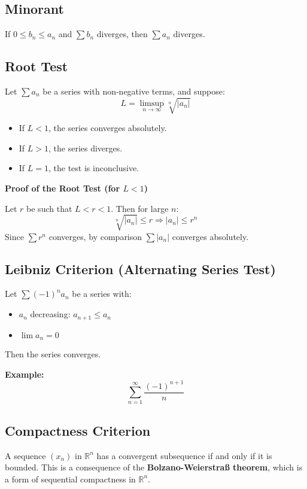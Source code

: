 \subsection{Minorant} 

If \(0 \le b_n \le a_n\) and \(\sum b_n\) diverges, then \(\sum a_n\) diverges.

\subsection{Root Test}

Let \(\sum a_n\) be a series with non-negative terms, and suppose:
\[
L = \limsup_{n \to \infty} \sqrt[n]{|a_n|}
\]

\begin{itemize}[label=\(-\)]
\item If \(L < 1\), the series converges absolutely.
\item If \(L > 1\), the series diverges.
\item If \(L = 1\), the test is inconclusive.
\end{itemize}

\textbf{Proof of the Root Test (for \(L < 1\))}

Let \(r\) be such that \(L < r < 1\). Then for large \(n\):
\[
\sqrt[n]{|a_n|} \le r \Rightarrow |a_n| \le r^n
\]
Since \(\sum r^n\) converges, by comparison \(\sum |a_n|\) converges absolutely.

\subsection{Leibniz Criterion (Alternating Series Test)}

Let \(\sum (-1)^n a_n\) be a series with:
\begin{itemize}[label=\(-\)]
\item \(a_n\) decreasing: \(a_{n+1} \le a_n\)
\item \(\lim a_n = 0\)
\end{itemize}
Then the series converges.

\textbf{Example:}
\[
\sum_{n=1}^\infty \frac{(-1)^{n+1}}{n}
\]

\subsection{Compactness Criterion}

A sequence \((x_n)\) in \(\mathbb{R}^n\) has a convergent subsequence if and only if it is bounded. This is a consequence of the \textbf{Bolzano-Weierstraß theorem}, which is a form of sequential compactness in \(\mathbb{R}^n\).

